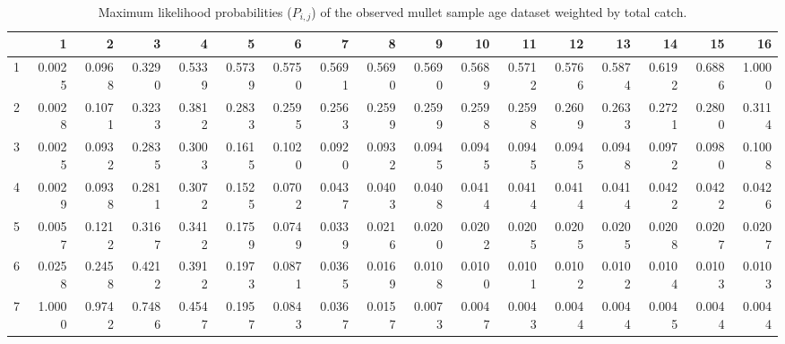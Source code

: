 \begin{sidewaystable}[ht]
\centering
\begin{tabular}{rrrrrrrrrrrrrrrrr}
  \hline
 & 1 & 2 & 3 & 4 & 5 & 6 & 7 & 8 & 9 & 10 & 11 & 12 & 13 & 14 & 15 & 16 \\ 
  \hline
1 & 0.0025 & 0.0968 & 0.3290 & 0.5339 & 0.5739 & 0.5750 & 0.5691 & 0.5690 & 0.5690 & 0.5689 & 0.5712 & 0.5766 & 0.5874 & 0.6192 & 0.6886 & 1.0000 \\ 
  2 & 0.0028 & 0.1071 & 0.3233 & 0.3812 & 0.2833 & 0.2595 & 0.2563 & 0.2599 & 0.2599 & 0.2598 & 0.2598 & 0.2609 & 0.2633 & 0.2721 & 0.2800 & 0.3114 \\ 
  3 & 0.0025 & 0.0932 & 0.2835 & 0.3003 & 0.1615 & 0.1020 & 0.0920 & 0.0932 & 0.0945 & 0.0945 & 0.0945 & 0.0945 & 0.0948 & 0.0972 & 0.0980 & 0.1008 \\ 
  4 & 0.0029 & 0.0938 & 0.2811 & 0.3072 & 0.1525 & 0.0702 & 0.0437 & 0.0403 & 0.0408 & 0.0414 & 0.0414 & 0.0414 & 0.0414 & 0.0422 & 0.0422 & 0.0426 \\ 
  5 & 0.0057 & 0.1212 & 0.3167 & 0.3412 & 0.1759 & 0.0749 & 0.0339 & 0.0216 & 0.0200 & 0.0202 & 0.0205 & 0.0205 & 0.0205 & 0.0208 & 0.0207 & 0.0207 \\ 
  6 & 0.0258 & 0.2458 & 0.4212 & 0.3912 & 0.1973 & 0.0871 & 0.0365 & 0.0169 & 0.0108 & 0.0100 & 0.0101 & 0.0102 & 0.0102 & 0.0104 & 0.0103 & 0.0103 \\ 
  7 & 1.0000 & 0.9742 & 0.7486 & 0.4547 & 0.1957 & 0.0843 & 0.0367 & 0.0157 & 0.0073 & 0.0047 & 0.0043 & 0.0044 & 0.0044 & 0.0045 & 0.0044 & 0.0044 \\ 
   \hline
\end{tabular}
\caption{Maximum likelihood probabilities ($P_{i,j}$) of the observed mullet sample age dataset weighted by total catch.} 
\label{tab:MaximumLikelihoodProbabilitiesOfMulletAgeSampleWeightedByTotalCatch}
\end{sidewaystable}
